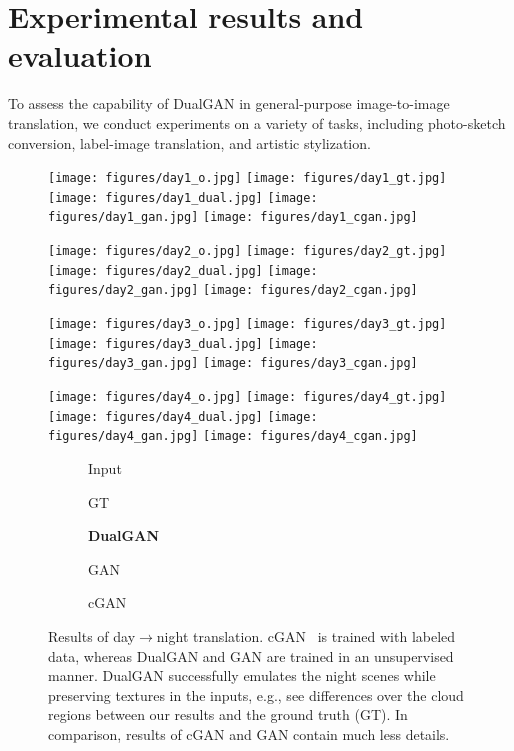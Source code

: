 \section{Experimental results and evaluation}
\label{sect:exp}

To assess the capability of DualGAN in general-purpose image-to-image translation, we 
conduct experiments on a variety of tasks, including photo-sketch conversion, 
label-image translation, and artistic stylization.

\begin{figure}
\begin{center}
\texttt{[image: figures/day1\_o.jpg]}
\texttt{[image: figures/day1\_gt.jpg]}
\texttt{[image: figures/day1\_dual.jpg]}
\texttt{[image: figures/day1\_gan.jpg]}
\texttt{[image: figures/day1\_cgan.jpg]}

\texttt{[image: figures/day2\_o.jpg]}
\texttt{[image: figures/day2\_gt.jpg]}
\texttt{[image: figures/day2\_dual.jpg]}
\texttt{[image: figures/day2\_gan.jpg]}
\texttt{[image: figures/day2\_cgan.jpg]}

\texttt{[image: figures/day3\_o.jpg]}
\texttt{[image: figures/day3\_gt.jpg]}
\texttt{[image: figures/day3\_dual.jpg]}
\texttt{[image: figures/day3\_gan.jpg]}
\texttt{[image: figures/day3\_cgan.jpg]}

\texttt{[image: figures/day4\_o.jpg]}
\texttt{[image: figures/day4\_gt.jpg]}
\texttt{[image: figures/day4\_dual.jpg]}
\texttt{[image: figures/day4\_gan.jpg]}
\texttt{[image: figures/day4\_cgan.jpg]}

\begin{subfigure}[]{0.19\linewidth}\caption*{Input}\end{subfigure}
\begin{subfigure}[]{0.19\linewidth}\caption*{GT}\end{subfigure}
\begin{subfigure}[]{0.19\linewidth}\caption*{\textbf{DualGAN}}\end{subfigure}
\begin{subfigure}[]{0.19\linewidth}\caption*{GAN}\end{subfigure}
\begin{subfigure}[]{0.19\linewidth}\caption*{cGAN~\cite{isola2016image}}\end{subfigure}
\caption{Results of day$\rightarrow$night translation. cGAN~\cite{isola2016image} is trained with labeled data, whereas DualGAN and GAN are trained in an unsupervised manner. DualGAN successfully emulates the night scenes while preserving textures in the inputs, e.g., see differences over the cloud regions between our results and the ground truth (GT). In comparison, results of cGAN and GAN contain much less details.}
\label{fig:day}
\end{center}
\end{figure}
